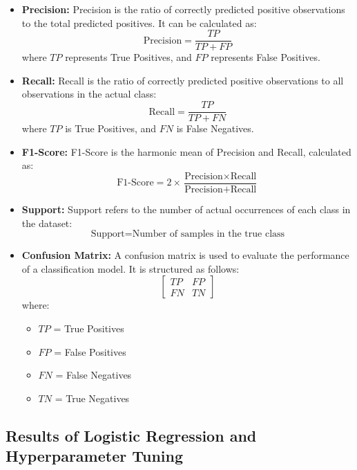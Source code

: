 \begin{itemize}
    \item \textbf{Precision:} Precision is the ratio of correctly predicted positive observations to the total predicted positives. It can be calculated as:
    \[
    \text{Precision} = \frac{TP}{TP + FP}
    \]
    where \( TP \) represents True Positives, and \( FP \) represents False Positives.

    \item \textbf{Recall:} Recall is the ratio of correctly predicted positive observations to all observations in the actual class:
    \[
    \text{Recall} = \frac{TP}{TP + FN}
    \]
    where \( TP \) is True Positives, and \( FN \) is False Negatives.

    \item \textbf{F1-Score:} F1-Score is the harmonic mean of Precision and Recall, calculated as:
    \[
    \text{F1-Score} = 2 \times \frac{\text{Precision} \times \text{Recall}}{\text{Precision} + \text{Recall}}
    \]

    \item \textbf{Support:} Support refers to the number of actual occurrences of each class in the dataset:
    \[
    \text{Support} = \text{Number of samples in the true class}
    \]

    \item \textbf{Confusion Matrix:} A confusion matrix is used to evaluate the performance of a classification model. It is structured as follows:
    \[
    \begin{bmatrix}
    TP & FP \\
    FN & TN
    \end{bmatrix}
    \]
    where:
    \begin{itemize}
        \item \( TP \) = True Positives
        \item \( FP \) = False Positives
        \item \( FN \) = False Negatives
        \item \( TN \) = True Negatives
    \end{itemize}
\end{itemize}

\subsection{Results of Logistic Regression and Hyperparameter Tuning}

